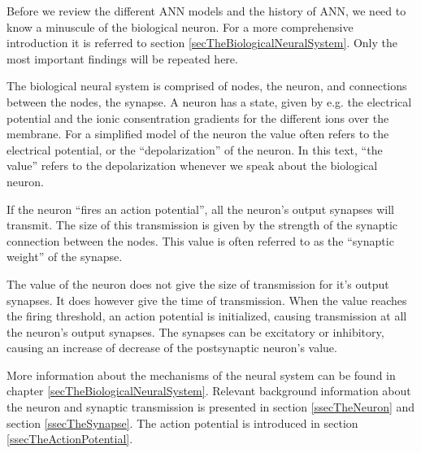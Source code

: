 Before we review the different ANN models and the history of ANN, we need to know a minuscule of the biological neuron. 
For a more comprehensive introduction it is referred to section \ref{secTheBiologicalNeuralSystem}.
Only the most important findings will be repeated here.

The biological neural system is comprised of nodes, the neuron, and connections between the nodes, the synapse.
A neuron has a state, given by e.g. the electrical potential and the ionic consentration gradients for the different ions over the membrane.
For a simplified model of the neuron the value often refers to the electrical potential, or the ``depolarization'' of the neuron. %
In this text, ``the value'' refers to the depolarization whenever we speak about the biological neuron.

If the neuron ``fires an action potential'', all the neuron's output synapses will transmit.
The size of this transmission is given by the strength of the synaptic connection between the nodes.
This value is often referred to as the ``synaptic weight'' of the synapse.

The value of the neuron does not give the size of transmission for it's output synapses. It does however give the time of transmission.%
When the value reaches the firing threshold, an action potential is initialized, causing transmission at all the neuron's output synapses.
The synapses can be excitatory or inhibitory, causing an increase of decrease of the postsynaptic neuron's value. %

More information about the mechanisms of the neural system can be found in chapter \ref{secTheBiologicalNeuralSystem}. 
Relevant background information about the neuron and synaptic transmission is presented in section \ref{ssecTheNeuron} and section \ref{ssecTheSynapse}. 
The action potential is introduced in section \ref{ssecTheActionPotential}.


